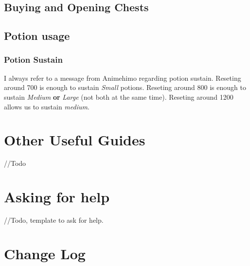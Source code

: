 \documentclass{article}
\begin{document}
\subsection{Buying and Opening Chests}
\subsection{Potion usage}

\subsubsection{Potion Sustain}
\label{sec:potionSustain}

I always refer to a message from Animehimo regarding potion sustain.
Reseting around 700 is enough to sustain \textit{Small} potions.
Reseting around 800 is enough to sustain \textit{Medium} \textbf{or} \textit{Large} (not both at the same time).
Reseting around 1200 allows us to sustain \textit{medium}.


\section{Other Useful Guides}

//Todo


\section{Asking for help}
//Todo, template to ask for help.



\section{Change Log}
\end{document}
